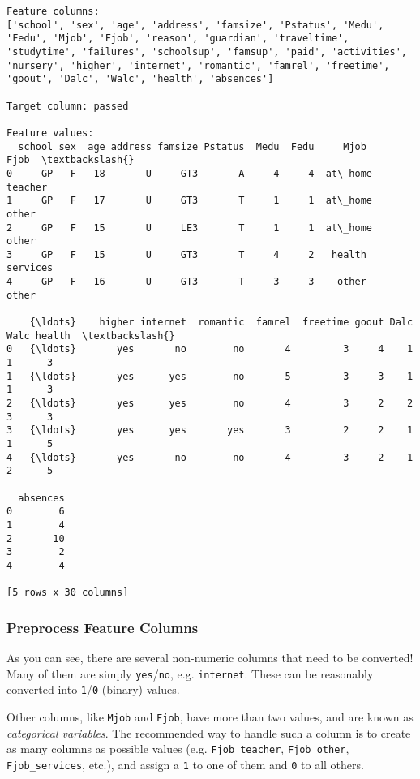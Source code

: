 \documentclass[11pt]{article}
\begin{document}
    \begin{Verbatim}[commandchars=\\\{\}]
Feature columns:
['school', 'sex', 'age', 'address', 'famsize', 'Pstatus', 'Medu', 'Fedu', 'Mjob', 'Fjob', 'reason', 'guardian', 'traveltime', 'studytime', 'failures', 'schoolsup', 'famsup', 'paid', 'activities', 'nursery', 'higher', 'internet', 'romantic', 'famrel', 'freetime', 'goout', 'Dalc', 'Walc', 'health', 'absences']

Target column: passed

Feature values:
  school sex  age address famsize Pstatus  Medu  Fedu     Mjob      Fjob  \textbackslash{}
0     GP   F   18       U     GT3       A     4     4  at\_home   teacher   
1     GP   F   17       U     GT3       T     1     1  at\_home     other   
2     GP   F   15       U     LE3       T     1     1  at\_home     other   
3     GP   F   15       U     GT3       T     4     2   health  services   
4     GP   F   16       U     GT3       T     3     3    other     other   

    {\ldots}    higher internet  romantic  famrel  freetime goout Dalc Walc health  \textbackslash{}
0   {\ldots}       yes       no        no       4         3     4    1    1      3   
1   {\ldots}       yes      yes        no       5         3     3    1    1      3   
2   {\ldots}       yes      yes        no       4         3     2    2    3      3   
3   {\ldots}       yes      yes       yes       3         2     2    1    1      5   
4   {\ldots}       yes       no        no       4         3     2    1    2      5   

  absences  
0        6  
1        4  
2       10  
3        2  
4        4  

[5 rows x 30 columns]

    \end{Verbatim}

    \subsubsection{Preprocess Feature
Columns}\label{preprocess-feature-columns}

As you can see, there are several non-numeric columns that need to be
converted! Many of them are simply \texttt{yes}/\texttt{no}, e.g.
\texttt{internet}. These can be reasonably converted into
\texttt{1}/\texttt{0} (binary) values.

Other columns, like \texttt{Mjob} and \texttt{Fjob}, have more than two
values, and are known as \emph{categorical variables}. The recommended
way to handle such a column is to create as many columns as possible
values (e.g. \texttt{Fjob\_teacher}, \texttt{Fjob\_other},
\texttt{Fjob\_services}, etc.), and assign a \texttt{1} to one of them
and \texttt{0} to all others.
\end{document}
